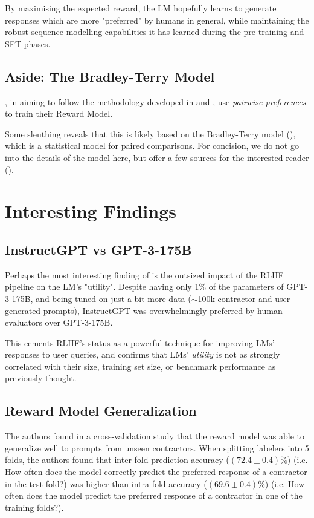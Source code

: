 \documentclass{article} %
\begin{document}
By maximising the expected reward,
the LM hopefully learns to generate responses which are more "preferred" by humans in general,
while maintaining the robust sequence modelling capabilities it has learned
during the pre-training and SFT phases.

\subsection{Aside: The Bradley-Terry Model} \label{sec:bt-model}

\cite{InstructGPT-2022}, in aiming to follow the methodology developed in
\cite{Ziegler-et-al-2019} and \cite{Stiennon-et-al-2020},
use \textit{pairwise preferences} to train their Reward Model.

Some sleuthing reveals that this is likely based on the Bradley-Terry model
(\cite{Bradley-and-Terry-1952}), which is a statistical model for paired comparisons.
For concision, we do not go into the details of the model here, but
offer a few sources for the interested reader 
(\cite{Bradley-and-Terry-1952, Stiennon-et-al-2020, Fujii-2024}).

\section{Interesting Findings}

\subsection{InstructGPT vs GPT-3-175B}
Perhaps the most interesting finding of \cite{InstructGPT-2022} is
the outsized impact of the RLHF pipeline on the LM's "utility".
Despite having only 1\% of the parameters of GPT-3-175B,
and being tuned on just a bit more data ($\sim$100k contractor and user-generated prompts),
InstructGPT was overwhelmingly preferred by human evaluators over GPT-3-175B.

This cements RLHF's status as a powerful technique for
improving LMs' responses to user queries, and confirms that
LMs' \textit{utility} is not as strongly correlated with their size, training set size,
or benchmark performance as previously thought.

\subsection{Reward Model Generalization}
The authors found in a cross-validation study that the reward model
was able to generalize well to prompts from unseen contractors.
When splitting labelers into 5 folds, the authors found that inter-fold
prediction accuracy ($(72.4 \pm 0.4) \%$) (i.e. How often does the model correctly predict
the preferred response of a contractor in the test fold?) was higher 
than intra-fold accuracy ($(69.6 \pm 0.4) \%$) (i.e. How often does the model
predict the preferred response of a contractor in one of the training folds?).
\end{document}
